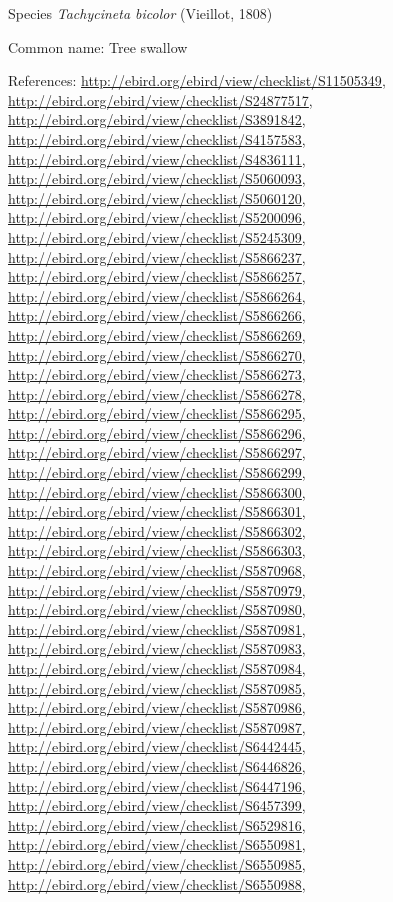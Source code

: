 \documentclass[9pt, article]{memoir}
\begin{document}
\begin{multicols}{2}
\vspace{6pt}\noindent\hspace{36pt}Species \textit{Tachycineta bicolor} (Vieillot, 1808)


Common name: Tree swallow

References: 
\url{http://ebird.org/ebird/view/checklist/S11505349}, 
\url{http://ebird.org/ebird/view/checklist/S24877517}, 
\url{http://ebird.org/ebird/view/checklist/S3891842}, 
\url{http://ebird.org/ebird/view/checklist/S4157583}, 
\url{http://ebird.org/ebird/view/checklist/S4836111}, 
\url{http://ebird.org/ebird/view/checklist/S5060093}, 
\url{http://ebird.org/ebird/view/checklist/S5060120}, 
\url{http://ebird.org/ebird/view/checklist/S5200096}, 
\url{http://ebird.org/ebird/view/checklist/S5245309}, 
\url{http://ebird.org/ebird/view/checklist/S5866237}, 
\url{http://ebird.org/ebird/view/checklist/S5866257}, 
\url{http://ebird.org/ebird/view/checklist/S5866264}, 
\url{http://ebird.org/ebird/view/checklist/S5866266}, 
\url{http://ebird.org/ebird/view/checklist/S5866269}, 
\url{http://ebird.org/ebird/view/checklist/S5866270}, 
\url{http://ebird.org/ebird/view/checklist/S5866273}, 
\url{http://ebird.org/ebird/view/checklist/S5866278}, 
\url{http://ebird.org/ebird/view/checklist/S5866295}, 
\url{http://ebird.org/ebird/view/checklist/S5866296}, 
\url{http://ebird.org/ebird/view/checklist/S5866297}, 
\url{http://ebird.org/ebird/view/checklist/S5866299}, 
\url{http://ebird.org/ebird/view/checklist/S5866300}, 
\url{http://ebird.org/ebird/view/checklist/S5866301}, 
\url{http://ebird.org/ebird/view/checklist/S5866302}, 
\url{http://ebird.org/ebird/view/checklist/S5866303}, 
\url{http://ebird.org/ebird/view/checklist/S5870968}, 
\url{http://ebird.org/ebird/view/checklist/S5870979}, 
\url{http://ebird.org/ebird/view/checklist/S5870980}, 
\url{http://ebird.org/ebird/view/checklist/S5870981}, 
\url{http://ebird.org/ebird/view/checklist/S5870983}, 
\url{http://ebird.org/ebird/view/checklist/S5870984}, 
\url{http://ebird.org/ebird/view/checklist/S5870985}, 
\url{http://ebird.org/ebird/view/checklist/S5870986}, 
\url{http://ebird.org/ebird/view/checklist/S5870987}, 
\url{http://ebird.org/ebird/view/checklist/S6442445}, 
\url{http://ebird.org/ebird/view/checklist/S6446826}, 
\url{http://ebird.org/ebird/view/checklist/S6447196}, 
\url{http://ebird.org/ebird/view/checklist/S6457399}, 
\url{http://ebird.org/ebird/view/checklist/S6529816}, 
\url{http://ebird.org/ebird/view/checklist/S6550981}, 
\url{http://ebird.org/ebird/view/checklist/S6550985}, 
\url{http://ebird.org/ebird/view/checklist/S6550988}, 

\end{multicols}
\end{document}
